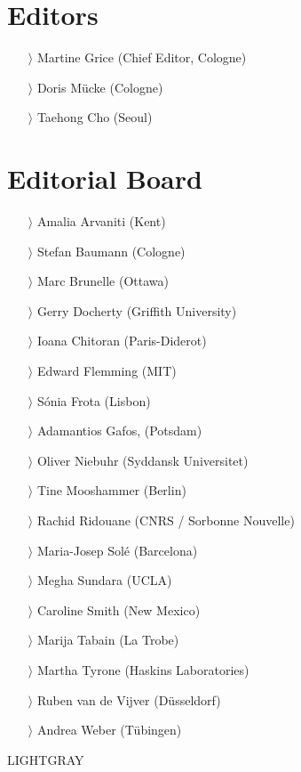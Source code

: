 \documentclass[
notumble,
nofoldmark,
]{leaflet}
\begin{document}
 
{
    \color{LIGHTGRAY}
\small
    \section{Editors}    

    \begin{itemize}
    \item[$\rangle$] Martine Grice (Chief Editor, Cologne)
    \item[$\rangle$] Doris M\"ucke (Cologne)
    \item[$\rangle$] Taehong Cho (Seoul)
    \end{itemize}

    \section{Editorial Board}    

    \begin{itemize}
    \item[$\rangle$] Amalia Arvaniti (Kent)
    \item[$\rangle$] Stefan Baumann (Cologne)
    \item[$\rangle$] Marc Brunelle (Ottawa)
    \item[$\rangle$] Gerry Docherty (Griffith University)
    \item[$\rangle$] Ioana Chitoran (Paris-Diderot)
    \item[$\rangle$] Edward Flemming (MIT)
    \item[$\rangle$] S\'onia Frota (Lisbon)
    \item[$\rangle$] Adamantios Gafos, (Potsdam)
    \item[$\rangle$] Oliver Niebuhr (Syddansk Universitet)
    \item[$\rangle$] Tine Mooshammer (Berlin)
    \item[$\rangle$] Rachid Ridouane (CNRS / Sorbonne Nouvelle)
    \item[$\rangle$] Maria-Josep Sol\'e (Barcelona)
    \item[$\rangle$] Megha Sundara (UCLA)
    \item[$\rangle$] Caroline Smith (New Mexico)
    \item[$\rangle$] Marija Tabain (La Trobe)
    \item[$\rangle$] Martha Tyrone (Haskins Laboratories)
    \item[$\rangle$] Ruben van de Vijver (D\"usseldorf)
    \item[$\rangle$] Andrea Weber (T\"ubingen) 
    \end{itemize}
}{LIGHTGRAY}
 
\end{document}

